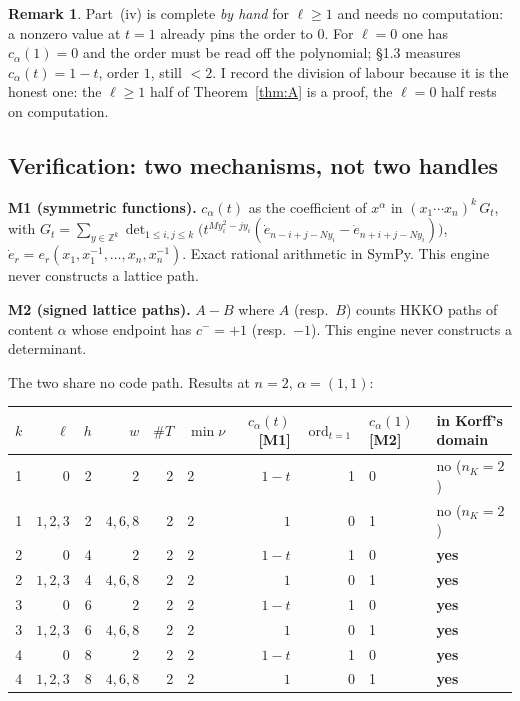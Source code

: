 \documentclass[11pt]{article}
\theoremstyle{definition}
\newtheorem{remark}[theorem]{Remark}
\DeclareMathOperator{\ord}{ord}
\newcommand{\Z}{\mathbb{Z}}
\begin{document}
\begin{remark}
Part~(iv) is complete \emph{by hand} for $\ell\ge1$ and needs no computation: a nonzero
value at $t=1$ already pins the order to $0$.  For $\ell=0$ one has $c_\alpha(1)=0$ and
the order must be read off the polynomial; \S1.3 measures
$c_\alpha(t)=1-t$, order $1$, still $<2$.  I record the division of labour because it
is the honest one: the $\ell\ge1$ half of Theorem~\ref{thm:A} is a proof, the $\ell=0$
half rests on computation.
\end{remark}

\subsection{Verification: two mechanisms, not two handles}

\textbf{M1 (symmetric functions).}  $c_\alpha(t)$ as the coefficient of $x^\alpha$ in
$(x_1\cdots x_n)^k\,G_t$, with
$G_t=\sum_{y\in\Z^k}\det_{1\le i,j\le k}\bigl(t^{My_i^2-jy_i}
(\dot e_{n-i+j-Ny_i}-\dot e_{n+i+j-Ny_i})\bigr)$,
$\dot e_r=e_r(x_1,x_1^{-1},\dots,x_n,x_n^{-1})$.  Exact rational arithmetic in SymPy.
This engine never constructs a lattice path.

\textbf{M2 (signed lattice paths).}  $A-B$ where $A$ (resp.\ $B$) counts HKKO paths of
content $\alpha$ whose endpoint has $c^-=+1$ (resp.\ $-1$).  This engine never
constructs a determinant.

The two share no code path.  Results at $n=2$, $\alpha=(1,1)$:

\begin{center}\small
\begin{tabular}{@{}rrrr rl rr ll@{}}
\toprule
$k$ & $\ell$ & $h$ & $w$ & $\#T$ & $\min\nu$ & $c_\alpha(t)$ [M1] & $\ord_{t=1}$ &
 $c_\alpha(1)$ [M2] & in Korff's domain \\
\midrule
1 & 0 & 2 & 2 & 2 & 2 & $1-t$ & 1 & 0 & no ($n_K=2$) \\
1 & $1,2,3$ & 2 & $4,6,8$ & 2 & 2 & $1$ & 0 & 1 & no ($n_K=2$) \\
2 & 0 & 4 & 2 & 2 & 2 & $1-t$ & 1 & 0 & \textbf{yes} \\
2 & $1,2,3$ & 4 & $4,6,8$ & 2 & 2 & $1$ & 0 & 1 & \textbf{yes} \\
3 & 0 & 6 & 2 & 2 & 2 & $1-t$ & 1 & 0 & \textbf{yes} \\
3 & $1,2,3$ & 6 & $4,6,8$ & 2 & 2 & $1$ & 0 & 1 & \textbf{yes} \\
4 & 0 & 8 & 2 & 2 & 2 & $1-t$ & 1 & 0 & \textbf{yes} \\
4 & $1,2,3$ & 8 & $4,6,8$ & 2 & 2 & $1$ & 0 & 1 & \textbf{yes} \\
\bottomrule
\end{tabular}
\end{center}
\end{document}
